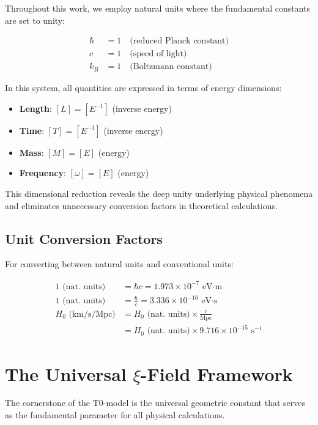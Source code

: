 \documentclass[12pt,a4paper]{report}
\begin{document}
	Throughout this work, we employ natural units where the fundamental constants are set to unity:
	
	\begin{align}
		\hbar &= 1 \quad \text{(reduced Planck constant)} \\
		c &= 1 \quad \text{(speed of light)} \\
		k_B &= 1 \quad \text{(Boltzmann constant)}
	\end{align}
	
	In this system, all quantities are expressed in terms of energy dimensions:
	\begin{itemize}
		\item \textbf{Length}: $[L] = [E^{-1}]$ (inverse energy)
		\item \textbf{Time}: $[T] = [E^{-1}]$ (inverse energy)
		\item \textbf{Mass}: $[M] = [E]$ (energy)
		\item \textbf{Frequency}: $[\omega] = [E]$ (energy)
	\end{itemize}
	
	This dimensional reduction reveals the deep unity underlying physical phenomena and eliminates unnecessary conversion factors in theoretical calculations.
	
	\subsection{Unit Conversion Factors}
	
	For converting between natural units and conventional units:
	
	\begin{align}
		1 \text{ (nat. units)} &= \hbar c = 1.973 \times 10^{-7} \text{ eV·m} \\
		1 \text{ (nat. units)} &= \frac{\hbar}{c} = 3.336 \times 10^{-16} \text{ eV·s} \\
		H_0 \text{ (km/s/Mpc)} &= H_0 \text{ (nat. units)} \times \frac{c}{\text{Mpc}} \\
		&= H_0 \text{ (nat. units)} \times 9.716 \times 10^{-15} \text{ s}^{-1}
	\end{align}
	
\section{The Universal $\xi$-Field Framework}

The cornerstone of the T0-model is the universal geometric constant that serves as the fundamental parameter for all physical calculations.
\end{document}

